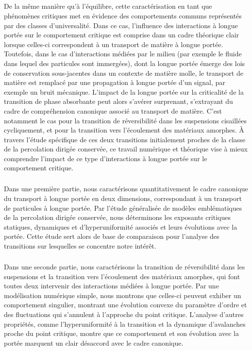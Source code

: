 \subparagraph{}De la même manière qu'à l'équilibre, cette caractérisation en tant que phénomènes critiques met en évidence des comportements communs représentés par des classes d'universalité. Dans ce cas, l'influence des interactions à longue portée sur le comportement critique est comprise dans un cadre théorique clair lorsque celles-ci correspondent à un transport de matière à longue portée. Toutefois, dans le cas d'interactions médiées par le milieu (par exemple le fluide dans lequel des particules sont immergées), dont la longue portée émerge des lois de conservation sous-jacentes dans un contexte de matière molle, le transport de matière est remplacé par une propagation à longue portée d’un signal, par exemple un bruit mécanique. L'impact de la longue portée sur la criticalité de la transition de phase absorbante peut alors s'avérer surprenant, s'extrayant du cadre de compréhension canonique associé au transport de matière. C'est notamment le cas pour la transition de réversibilité dans les suspensions cisaillées cycliquement, et pour la transition vers l'écoulement des matériaux amorphes. \`A travers l'étude spécifique de ces deux transitions initialement proches de la classe de la percolation dirigée conservée, ce travail numérique et théorique vise à mieux comprendre l'impact de ce type d'interactions à longue portée sur le comportement critique.

\subparagraph{}Dans une première partie, nous caractérisons quantitativement le cadre canonique du transport à longue portée en deux dimensions, correspondant à un transport de particules à longue portée. Par l'étude généralisée de modèles emblématiques de la percolation dirigée conservée, nous déterminons les exposants critiques statiques, dynamiques et d'hyperuniformité associés et leurs évolutions avec la portée. Cette étude sert alors de base de comparaison pour l'analyse des transitions sur lesquelles se concentre notre intérêt.

\subparagraph{}Dans une seconde partie, nous caractérisons la transition de réversibilité dans les suspensions et la transition vers l’écoulement des matériaux amorphes, qui font toutes deux intervenir des interactions médiées à longue portée.  Par une modélisation numérique simple, nous montrons que celles-ci peuvent exhiber un comportement singulier, montrant une évolution convexe du paramètre d'ordre et des fluctuations qui s'annulent à l'approche du point critique. L'analyse d'autres propriétés, comme l'hyperuniformité à la transition et la dynamique d'avalanches proche du point critique, montre que ce comportement et son évolution avec la portée marquent un clair désaccord avec le cadre canonique. 


